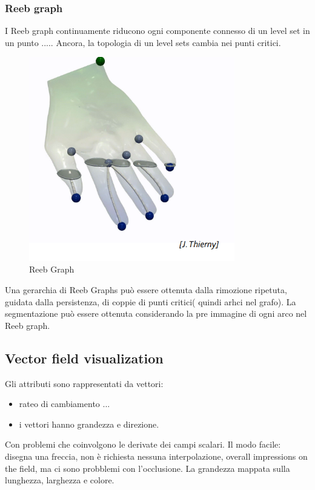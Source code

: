 \subsubsection{Reeb graph}
I Reeb graph continuamente riducono  ogni componente connesso di un level set in un punto .....
Ancora, la topologia di un level sets cambia nei punti critici.
\begin{figure}[H]
    \centering
    \includegraphics[width=0.8\textwidth]{images/ReebGraph.png} 
    \caption{Reeb Graph}
    \label{fig:immagine}
\end{figure}
Una gerarchia di Reeb Graphs può essere ottenuta dalla rimozione ripetuta, guidata dalla persistenza, di coppie di punti critici( quindi arhci nel grafo).
La segmentazione può essere ottenuta considerando la pre immagine di ogni arco nel Reeb graph.
\subsection{Vector field visualization}
Gli attributi sono rappresentati da vettori:
\begin{itemize}
    \item rateo di cambiamento ... 
    \item i vettori hanno grandezza e direzione.
\end{itemize}
Con problemi che coinvolgono le derivate dei campi scalari.
Il modo facile: disegna una freccia, non è richiesta nessuna interpolazione, overall impressions on the field, ma ci sono probblemi con l'occlusione.
La grandezza mappata sulla lunghezza, larghezza e colore.

